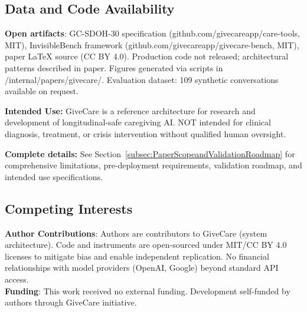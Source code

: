 \documentclass{article}
\begin{document}
\subsection{Data and Code Availability}%
\label{subsec:DataCodeAvailability}%
\label{sec:CodeAvailability}%
\textbf{Open artifacts}: GC-SDOH-30 specification (github.com/givecareapp/care-tools, MIT), InvisibleBench framework (github.com/givecareapp/givecare-bench, MIT), paper LaTeX source (CC BY 4.0). Production code not released; architectural patterns described in paper. Figures generated via scripts in /internal/papers/givecare/. Evaluation dataset: 109 synthetic conversations available on request.

\begin{tcolorbox}[colback=gcOrange!20!white,colframe=gcOrange,title=\textbf{Intended Use \& Limits},boxrule=2pt]
\textbf{Intended Use:} GiveCare is a reference architecture for research and development of longitudinal-safe caregiving AI. NOT intended for clinical diagnosis, treatment, or crisis intervention without qualified human oversight.

\textbf{Complete details:} See Section~\ref{subsec:PaperScopeandValidationRoadmap} for comprehensive limitations, pre-deployment requirements, validation roadmap, and intended use specifications.
\end{tcolorbox}
\subsection{Competing Interests}%
\label{subsec:CompetingInterests}%
\textbf{Author Contributions}: Authors are contributors to GiveCare (system architecture). Code and instruments are open-sourced under MIT/CC BY 4.0 licenses to mitigate bias and enable independent replication. No financial relationships with model providers (OpenAI, Google) beyond standard API access.\\[0.5em]

\textbf{Funding}: This work received no external funding. Development self-funded by authors through GiveCare initiative.
\end{document}
